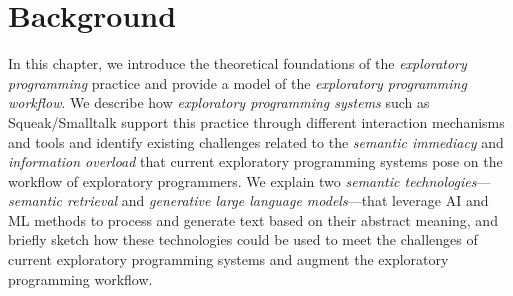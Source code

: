 
\chapter{Background}
\label{cha:background}

In this chapter, we introduce the theoretical foundations of the \emph{exploratory programming} practice and provide a model of the \emph{exploratory programming workflow}.
We describe how \emph{exploratory programming systems} such as Squeak/Smalltalk support this practice through different interaction mechanisms and tools and identify existing challenges related to the \emph{semantic immediacy} and \emph{information overload} that current exploratory programming systems pose on the workflow of exploratory programmers.
We explain two \emph{semantic technologies}---\emph{semantic retrieval} and \emph{generative large language models}---that leverage AI and ML methods to process and generate text based on their abstract meaning, and briefly sketch how these technologies could be used to meet the challenges of current exploratory programming systems and augment the exploratory programming workflow.

